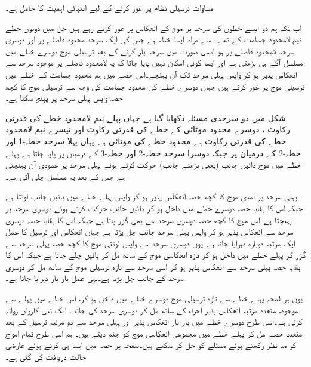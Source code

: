 مساوات  ترسیلی نظام پر غور کرنے کے لیے انتہائی اہمیت کا حامل ہے۔

اب تک ہم دو ایسے خطوں کی سرحد پر موج کے انعکاس پر غور کرتے رہے ہیں جن میں دونوں خطے نیم لامحدود جسامت کے تھے۔ سے مراد ایسا خطہ ہے جس کی ایک سرحد محدود فاصلے پر اور دوسری سرحد لامحدود فاصلے پر ہو۔ایسی صورت میں سرحد پار کرنے کے بعد ترسیلی موج دوسرے خطے میں مسلسل آگے ہی بڑھتی ہے اور ایسا کوئی امکان نہیں پایا جاتا کہ یہ لامحدود فاصلے پر موجود  سرحد سے انعکاس پذیر ہو کر واپس پہلی سرحد تک آن پہنچے۔اس حصے میں ہم محدود جسامت کے خطے میں ترسیلی موج پر غور کرتے ہیں جہاں دوسرے خطے کی محدود جسامت کی وجہ سے ترسیلی موج کا کچھ حصہ واپس پہلی سرحد پر پہنچ سکتا ہے۔

شکل  میں دو سرحدی مسئلہ دکھایا گیا ہے جہاں پہلے نیم لامحدود خطے کی قدرتی رکاوٹ ، دوسرے محدود موٹائی کے خطے کی قدرتی رکاوٹ  اور تیسرے نیم لامحدود خطے کی قدرتی رکاوٹ  ہے۔محدود خطے کی موٹائی  ہے۔یہاں پہلا سرحد خطہ-1 اور خطہ-2 کے درمیان  پر جبکہ دوسرا سرحد خطہ-2 اور خطہ-3 کے درمیان  پر پایا جاتا ہے۔پہلے خطے میں موج دائیں جانب (یعنی بڑھتے  جانب) حرکت کرتے ہوئے پہلی سرحد پر عمودی آن پہنچتی ہے جس کے بعد یہ مسلسل چلی آتی ہے۔

پہلی سرحد پر آمدی موج کا کچھ حصہ انعکاس پذیر ہو کر واپس پہلے خطے میں بائیں جانب لوٹتا ہے جبکہ اس کا بقایا حصہ دوسرے خطے میں داخل ہو کر دائیں جانب حرکت کرتے ہوئے دوسری سرحد پر پہنچتا ہے۔اس موج کا کچھ حصہ دوسری سرحد سے بھی گزر پاتا ہے جبکہ اس کا بقایا حصہ دوسری سرحد سے انعکاس پذیر ہو کر واپس پہلی سرحد جانب چل پڑتا ہے جہاں انعکاس اور ترسیل کا عمل ایک مرتبہ دوبارہ دہرایا جاتا ہے۔یوں دوسری سرحد سے واپس لوٹتی موج کا کچھ حصہ پہلی سرحد سے گزر کر پہلے خطے میں داخل ہو کر تازہ انعکاسی موج کے ساتھ مل کر بائیں چلے جاتا ہے جبکہ اس کا بقایا حصہ پہلی سرحد سے انعکاس پذیر ہو کر اسی سرحد سے تازہ ترسیلی موج کے ساتھ مل کر  دوسری سرحد کے جانب چل پڑتا ہے۔یہی عمل بار بار دہرایا جاتا ہے۔

یوں ہر لمحہ پہلے خطے سے تازہ ترسیلی موج دوسرے خطے میں داخل ہو کر، اس خطے میں پہلے سے موجود، متعدد مرتبہ انعکاس پذیر اجزاء کے ساتھ مل کر دوسری سرحد کی جانب ایک نئی کارواں روانہ کرتی ہے۔اسی طرح دوسرے خطے میں بار بار انعکاس پذیر اور پہلی سرحد سے دو مرتبہ ترسیل کے بعد متعدد حصے مل کر پہلے خطے میں مجموعی انعکاسی موج کو جنم دیتے ہیں۔  
ہم اسی طرح تمام امواج کو مد نظر رکھتے ہوئے مسئلے کو حل کر سکتے ہیں۔صفحہ  پر حصہ  میں ایسا ہی کرتے ہوئے عارضی حالت دریافت کی گئی ہے۔

